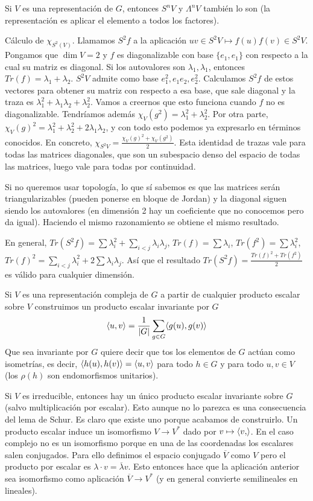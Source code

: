 \documentclass[ANAyTR.tex]{subfiles}
\begin{document}
Si $V$ es una representación de $G$, entonces $S^nV$ y $\Lambda^nV$ también lo son (la representación es aplicar el elemento a todos los factores).


Cálculo de $\chi_{S^2(V)}$. Llamamos $S^2f$ a la aplicación $uv\in S^2V\mapsto f(u)f(v)\in S^2V$. Pongamos que $\dim V=2$ y $f$ es diagonalizable con base $\{e_1,e_1\}$ con respecto a la cual su matriz es diagonal. Si los autovalores son $\lambda_1,\lambda_1$, entonces $Tr(f)=\lambda_1+\lambda_2$. $S^2V$ admite como base $e_1^2, e_1e_2, e_2^2$. Calculamos $S^2f$ de estos vectores para obtener su matriz con respecto a esa base, que sale diagonal y la traza es $\lambda_1^2+\lambda_1\lambda_2+\lambda_2^2$. Vamos a creernos que esto funciona cuando $f$ no es diagonalizable. Tendríamos además $\chi_V(g^2)=\lambda_1^2+\lambda_2^2$. Por otra parte, $\chi_V(g)^2=\lambda_1^2+\lambda_2^2+2\lambda_1\lambda_2$, y con todo esto podemos ya expresarlo en términos conocidos. En concreto, $\chi_{S^2V}=\frac{\chi_V(g)^2+\chi_V(g^2)}{2}$. Esta identidad de trazas vale para todas las matrices diagonales, que son un subespacio denso del espacio de todas las matrices, luego vale para todas por continuidad. 

Si no queremos usar topología, lo que sí sabemos es que las matrices serán triangularizables (pueden ponerse en bloque de Jordan) y la diagonal siguen siendo los autovalores (en dimensión 2 hay un coeficiente que no conocemos pero da igual). Haciendo el mismo razonamiento se obtiene el mismo resultado.

En general, $Tr(S^2f)=\sum\lambda_i^2+\sum_{i<j}\lambda_i\lambda_j$, $Tr(f)=\sum\lambda_i$, $Tr(f^2)=\sum\lambda_i^2$, $Tr(f)^2=\sum_{i<j}\lambda_i^2+2\sum\lambda_i\lambda_j$. Así que el resultado $Tr(S^2f)=\frac{Tr(f)^2+Tr(f^2)}{2}$ es válido para cualquier dimensión. 

Si $V$ es una representación compleja de $G$ a partir de cualquier producto escalar sobre $V$ construimos un producto escalar invariante por $G$
\[
\langle{u,v}\rangle=\frac{1}{|G|}\sum_{g\in G}\langle{g(u),g(v)}\rangle
\]
Que sea invariante por $G$ quiere decir que tos los elementos de $G$ actúan como isometrías, es decir, $\langle{h(u),h(v)}\rangle=\langle{u,v}\rangle$ para todo $h\in G$ y para todo $u,v\in V$ (los $\rho(h)$ son endomorfismos unitarios). 

Si $V$ es irreducible, entonces hay un único producto escalar invariante sobre $G$ (salvo multiplicación por escalar). Esto aunque no lo parezca es una consecuencia del lema de Schur. Es claro que existe uno porque acabamos de construirlo. Un producto escalar induce un isomorfismo $V\to V^*$ dado por $v\mapsto \langle{v,}\rangle$. En el caso complejo no es un isomorfismo porque en una de las coordenadas los escalares salen conjugados. Para ello definimos el espacio conjugado $\overline{V}$ como $V$ pero el producto por escalar es $\lambda\cdot v=\overline{\lambda}v$. Esto entonces hace que la aplicación anterior sea isomorfismo como aplicación $\overline{V}\to V^*$ (y en general convierte semilineales en lineales).
\end{document}
